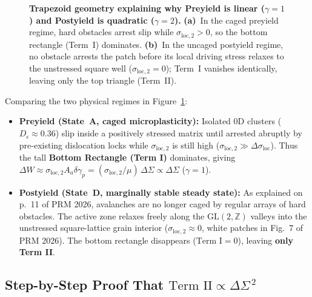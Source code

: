 \documentclass[11pt,a4paper]{article}
\newcommand{\Z}{\mathbb{Z}}
\newcommand{\dS}{\Delta\Sigma}
\newcommand{\dW}{\Delta W}
\newcommand{\dsigloc}{\Delta\sigma_{\mathrm{loc}}}
\newcommand{\dgamp}{\delta\gamma_p}
\begin{document}
\begin{figure}[ht!]
{%
}
\caption{\textbf{Trapezoid geometry explaining why Preyield is linear ($\gamma=1$) and Postyield is quadratic ($\gamma=2$).} \textbf{(a)}~In the caged preyield regime, hard obstacles arrest slip while $\sigma_{\mathrm{loc},2} > 0$, so the bottom rectangle (Term~I) dominates. \textbf{(b)}~In the uncaged postyield regime, no obstacle arrests the patch before its local driving stress relaxes to the unstressed square well ($\sigma_{\mathrm{loc},2}=0$); Term~I vanishes identically, leaving only the top triangle (Term~II).}
\label{fig:trapezoid}
\end{figure}

Comparing the two physical regimes in Figure~\ref{fig:trapezoid}:
\begin{itemize}[nosep]
  \item \textbf{Preyield (State~A, caged microplasticity):} Isolated 0D clusters ($D_\epsilon \approx 0.36$) slip inside a positively stressed matrix until arrested abruptly by pre-existing dislocation locks while $\sigma_{\mathrm{loc},2}$ is still high ($\sigma_{\mathrm{loc},2} \gg \dsigloc$). Thus the tall \textbf{Bottom Rectangle (Term I)} dominates, giving $\dW \approx \sigma_{\mathrm{loc},2} A_a \dgamp = (\sigma_{\mathrm{loc},2}/\mu)\,\dS \propto \dS$ ($\gamma=1$).
  \item \textbf{Postyield (State~D, marginally stable steady state):} As explained on p.~11 of PRM 2026, avalanches are no longer caged by regular arrays of hard obstacles. The active zone relaxes freely along the $\mathrm{GL}(2,\Z)$ valleys into the unstressed square-lattice grain interior ($\sigma_{\mathrm{loc},2} \approx 0$, white patches in Fig.~7 of PRM 2026). The bottom rectangle disappears ($\text{Term I} = 0$), leaving \textbf{only Term II}.
\end{itemize}

\subsection{Step-by-Step Proof That \texorpdfstring{$\text{Term II} \propto \dS^{\,2}$}{Term II propto Delta Sigma\textasciicircum 2}}
\end{document}
